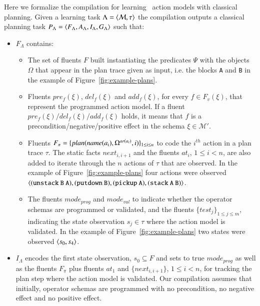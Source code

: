Here we formalize the compilation for learning \strips\ action models with classical planning. Given a learning task $\Lambda={\langle \mathcal{M},\tau \rangle}$ the compilation outputs a classical planning task $P_{\Lambda}={\langle F_{\Lambda},A_{\Lambda},I_{\Lambda},G_{\Lambda} \rangle}$ such that:
\begin{itemize}
\item $F_{\Lambda}$ contains:
\begin{itemize}
\item The set of fluents $F$ built instantiating the predicates $\Psi$ with the objects $\Omega$ that appear in the plan trace given as input, i.e. the blocks {\tt\small A} and {\tt\small B} in the example of Figure~\ref{fig:example-plans}. 
\item Fluents $pre_f(\xi)$, $del_f(\xi)$ and $add_f(\xi)$, for every $f\in F_v(\xi)$, that represent the programmed action model. If a fluent $pre_f(\xi)/del_f(\xi)/add_f(\xi)$ holds, it means that $f$ is a precondition/negative/positive effect in the schema $\xi\in \mathcal{M}'$. 
\item Fluents $F_{\pi}=\{plan(name(a_i),\Omega^{ar(a_i)},i)\}_{\small 1\leq i\leq n}$ to code the $i^{th}$ action in a plan trace $\tau$. The static facts $next_{i,i+1}$ and the fluents $at_i$, {\small $1\leq i< n$}, are also added to iterate through the $n$ actions of $\tau$ that are observed. In the example of Figure~\ref{fig:example-plans} four actions were observed ${\langle \small\tt (unstack\ B\ A), (putdown\ B), (pickup\ A), (stack\ A\ B) \rangle}$. 
\item The fluents $mode_{prog}$ and $mode_{val}$ to indicate whether the operator schemas are programmed or validated, and the fluents $\{test_j\}_{1\leq j\leq m}$, indicating the state observation $s_j\in\tau$ where the action model is validated. In the example of Figure~\ref{fig:example-plans} two states were observed ${\langle s_0,s_4 \rangle}$.
\end{itemize}
\item $I_{\Lambda}$ encodes the first state observation, $s_0\subseteq F$ and sets to true $mode_{prog}$ as well as the fluents $F_{\pi}$ plus fluents $at_1$ and $\{next_{i,i+1}\}$, {\small $1\leq i<n$}, for tracking the plan step where the action model is validated. Our compilation assumes that initially, operator schemas are programmed with no precondition, no negative effect and no positive effect. 


\end{itemize}
